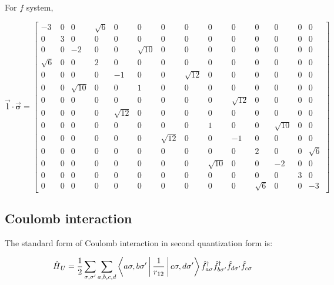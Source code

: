 For $f$ system,

\begin{equation}
\vec{\mathbf{l}}\cdot\vec{\mathbf{\sigma}}=\left[\begin{array}{cccccccccccccc}
-3 & 0 & 0 & \sqrt{6} & 0 & 0 & 0 & 0 & 0 & 0 & 0 & 0 & 0 & 0\\
0 & 3 & 0 & 0 & 0 & 0 & 0 & 0 & 0 & 0 & 0 & 0 & 0 & 0\\
0 & 0 & -2 & 0 & 0 & \sqrt{10} & 0 & 0 & 0 & 0 & 0 & 0 & 0 & 0\\
\sqrt{6} & 0 & 0 & 2 & 0 & 0 & 0 & 0 & 0 & 0 & 0 & 0 & 0 & 0\\
0 & 0 & 0 & 0 & -1 & 0 & 0 & \sqrt{12} & 0 & 0 & 0 & 0 & 0 & 0\\
0 & 0 & \sqrt{10} & 0 & 0 & 1 & 0 & 0 & 0 & 0 & 0 & 0 & 0 & 0\\
0 & 0 & 0 & 0 & 0 & 0 & 0 & 0 & 0 & \sqrt{12} & 0 & 0 & 0 & 0\\
0 & 0 & 0 & 0 & \sqrt{12} & 0 & 0 & 0 & 0 & 0 & 0 & 0 & 0 & 0\\
0 & 0 & 0 & 0 & 0 & 0 & 0 & 0 & 1 & 0 & 0 & \sqrt{10} & 0 & 0\\
0 & 0 & 0 & 0 & 0 & 0 & \sqrt{12} & 0 & 0 & -1 & 0 & 0 & 0 & 0\\
0 & 0 & 0 & 0 & 0 & 0 & 0 & 0 & 0 & 0 & 2 & 0 & 0 & \sqrt{6}\\
0 & 0 & 0 & 0 & 0 & 0 & 0 & 0 & \sqrt{10} & 0 & 0 & -2 & 0 & 0\\
0 & 0 & 0 & 0 & 0 & 0 & 0 & 0 & 0 & 0 & 0 & 0 & 3 & 0\\
0 & 0 & 0 & 0 & 0 & 0 & 0 & 0 & 0 & 0 & \sqrt{6} & 0 & 0 & -3
\end{array}\right]
\end{equation}



\subsection{Coulomb interaction}

The standard form of Coulomb interaction in second quantization form
is:

\begin{equation}
\text{\ensuremath{\hat{H}}}_{U}=\frac{1}{2}\sum_{\sigma,\sigma^{\prime}}\sum_{a,b,c,d}\Braket{a\sigma,b\sigma^{\prime}|\frac{1}{r_{12}}|c\sigma,d\sigma^{\prime}}\hat{f}_{a\sigma}^{\dagger}\hat{f}_{b\sigma^{\prime}}^{\dagger}\hat{f}_{d\sigma^{\prime}}\hat{f}_{c\sigma}\label{eq:gen_form}
\end{equation}


